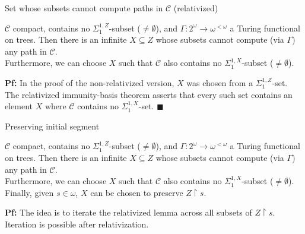 \begin{frame}{Set whose subsets cannot compute paths in $\mathcal{C}$
(relativized)}
  \begin{main-lemma*}[Relativized]
    $\mathcal{C}$ compact, contains no $\Sigma_1^{1,Z}$-subset
    ($\neq\emptyset$), and $\Gamma:2^{\omega}\rightarrow \omega^{<\omega}$
    a Turing functional on trees. Then there is an infinite $X\subseteq Z$
    whose subsets cannot compute (via $\Gamma$) any path in
    $\mathcal{C}$.\\
    \vspace{0.5em}
    Furthermore, we can choose $X$ such that $\mathcal{C}$ also contains no
    $\Sigma_1^{1,X}$-subset ($\neq\emptyset$).
  \end{main-lemma*}

  \vspace{1em}
  \textbf{Pf:} In the proof of the non-relativized version, $X$ was chosen
  from a $\Sigma_1^{1,Z}$-set. The relativized immunity-basis theorem
  asserts that every such set contains an element $X$ where $\mathcal{C}$
  contains no $\Sigma_1^{1,X}$-set. $\blacksquare$
\end{frame}

\begin{frame}{Preserving initial segment}
  \begin{main-lemma*}
    $\mathcal{C}$ compact, contains no $\Sigma_1^{1,Z}$-subset
    ($\neq\emptyset$), and $\Gamma:2^{\omega}\rightarrow \omega^{<\omega}$
    a Turing functional on trees. Then there is an infinite $X\subseteq Z$
    whose subsets cannot compute (via $\Gamma$) any path in
    $\mathcal{C}$.\\
    \vspace{0.5em}
    Furthermore, we can choose $X$ such that $\mathcal{C}$ also contains no
    $\Sigma_1^{1,X}$-subset ($\neq\emptyset$).\\
    \vspace{0.5em}
    Finally, given $s\in\omega$, $X$ can be chosen to preserve
    $Z\restriction s$.
  \end{main-lemma*}

  \vspace{1em}
  \textbf{Pf:} The idea is to iterate the relativized lemma across all
  subsets of $Z\restriction s$. Iteration is possible after relativization.
\end{frame}

